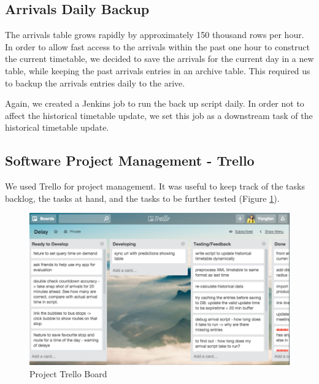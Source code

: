 \subsection{Arrivals Daily Backup}
\par The arrivals table grows rapidly by approximately 150 thousand rows per hour. In order to allow fast access to the arrivals within the past one hour to construct the current timetable, we decided to save the arrivals for the current day in a new table, while keeping the past arrivals entries in an archive table. This required us to backup the arrivals entries daily to the arive.

\par Again, we created a Jenkins job to run the back up script daily. In order not to affect the historical timetable update, we set this job as a downstream task of the historical timetable update.

\subsection{Software Project Management - Trello}
\par We used Trello \cite{trello} for project management. It was useful to keep track of the tasks backlog, the tasks at hand, and the tasks to be further tested (Figure \ref{fig:trello}).

\begin{figure}
\centering
\includegraphics[width=\textwidth]{figures/trello_small.png}
\caption{\label{fig:trello} Project Trello Board}
\end{figure}
